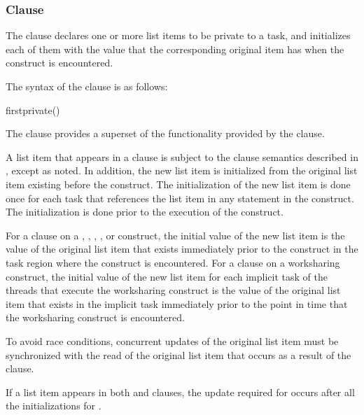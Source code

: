 \subsubsection{ Clause}
\label{subsubsec:firstprivate clause}
\summary
The  clause declares one or more list items to be private to a task, and 
initializes each of them with the value that the corresponding original item has when the 
construct is encountered. 

\syntax
The syntax of the  clause is as follows:

\begin{boxedcode}
firstprivate()
\end{boxedcode}

\descr
The  clause provides a superset of the functionality provided by the 
 clause. 

A list item that appears in a  clause is subject to the  clause 
semantics described in 
, 
except as noted. In addition, the 
new list item is initialized from the original list item existing before the construct. The 
initialization of the new list item is done once for each task that references the list item 
in any statement in the construct. The initialization is done prior to the execution of the 
construct.

For a  clause on a , ,
, , or  construct, the
initial value of the new list item is the value of the original list
item that exists immediately prior to the construct in the task region
where the construct is encountered. For a  clause
on a worksharing construct, the initial value of the new list item for
each implicit task of the threads that execute the worksharing
construct is the value of the original list item that exists in the
implicit task immediately prior to the point in time that the
worksharing construct is encountered.

To avoid race conditions, concurrent updates of the original list item must be 
synchronized with the read of the original list item that occurs as a result of the 
 clause.

If a list item appears in both  and  clauses, the update 
required for  occurs after all the initializations for .

